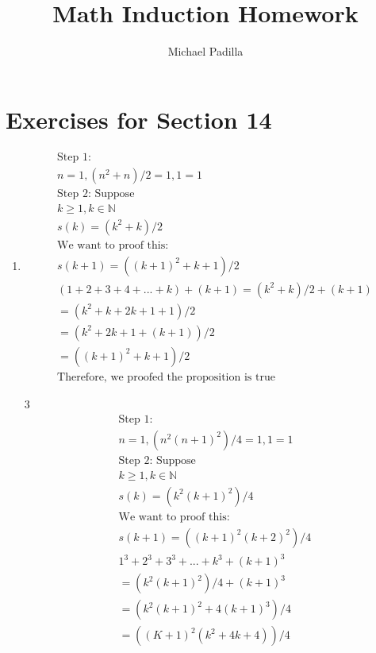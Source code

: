\documentclass[12pt]{article}
\title{Math Induction Homework}
\author{Michael Padilla}
\begin{document}
 
\maketitle
\section*{Exercises for Section 14}
\begin{enumerate}
	\item 
	    \begin{equation*}
	    	\begin{split}
		    \text{Step 1:}\\
		    n = 1, (n^2 + n)/2 = 1, 1 = 1\\
		    \text{Step 2: Suppose}\\
		    k \ge 1, k \in \mathbb{N}\\
		    s(k) = (k^2 + k) / 2\\
		    \text{We want to proof this:}\\
		    s(k + 1) = ((k+1)^2 + k + 1)/2\\
		    (1+2+3+4+...+k)+(k+1) = (k^2 + k)/2 + (k + 1)\\
		    = (k^2 + k + 2k + 1 + 1)/2\\
		    = (k^2 + 2k + 1 + (k + 1))/2\\
		    = ((k+1)^2 + k + 1)/2\\
		    \text{Therefore, we proofed the proposition is true}
	    	\end{split}
	    \end{equation*}
	\item [3] 
	    \begin{equation*}
	    	\begin{split}
		    \text{Step 1:}\\
		    n = 1, (n^2(n+1)^2)/4 = 1, 1 = 1\\
		    \text{Step 2: Suppose}\\
		    k \ge 1, k \in \mathbb{N}\\
		    s(k) = (k^2 (k+1)^2)/4\\
		    \text{We want to proof this:}\\
		    s(k+1) = ((k+1)^2 (k+2)^2)/4\\
		    1^3 + 2^3 + 3^3 + ... + k^3 + (k + 1)^3\\
		    = (k^2 (k+1)^2)/4 + (k + 1)^3\\
		    = (k^2 (k+1)^2 + 4(k + 1)^3)/4\\
		    = ((K+1)^2(k^2+ 4k + 4))/4\\

\end{split}
\end{equation*}
\end{enumerate}
\end{document}
